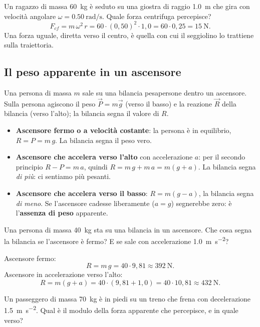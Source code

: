 \begin{testexample}
Un ragazzo di massa \SI{60}{\kilo\gram} è seduto su una giostra di raggio \SI{1,0}{\metre} che gira con velocità angolare $\omega = \SI{0,50}{\radian\per\second}$. Quale forza centrifuga percepisce?
\[ F_{cf} = m\,\omega^2\,r = 60 \cdot (0{,}50)^2 \cdot 1{,}0 = 60 \cdot 0{,}25 = \SI{15}{\newton}. \]
Una forza uguale, diretta verso il centro, è quella con cui il seggiolino lo trattiene sulla traiettoria.
\end{testexample}

\subsection{Il peso apparente in un ascensore}
Una persona di massa $m$ sale su una bilancia pesapersone dentro un ascensore. Sulla persona agiscono il peso $\vec P = m\vec g$ (verso il basso) e la reazione $\vec R$ della bilancia (verso l'alto); la bilancia segna il valore di $R$.

\begin{itemize}
    \item \textbf{Ascensore fermo o a velocità costante}: la persona è in equilibrio, $R = P = m\,g$. La bilancia segna il peso vero.
    \item \textbf{Ascensore che accelera verso l'alto} con accelerazione $a$: per il secondo principio $R - P = m\,a$, quindi $R = m\,g + m\,a = m(g + a)$. La bilancia segna \emph{di più}: ci sentiamo più pesanti.
    \item \textbf{Ascensore che accelera verso il basso}: $R = m(g - a)$, la bilancia segna \emph{di meno}. Se l'ascensore cadesse liberamente ($a = g$) segnerebbe zero: è l'\textbf{assenza di peso} apparente.
\end{itemize}

\begin{testexample}
Una persona di massa \SI{40}{\kilo\gram} sta su una bilancia in un ascensore. Che cosa segna la bilancia se l'ascensore è fermo? E se sale con accelerazione \SI{1,0}{\metre\per\second\squared}?

Ascensore fermo:
\[ R = m\,g = 40 \cdot 9{,}81 \approx \SI{392}{\newton}. \]
Ascensore in accelerazione verso l'alto:
\[ R = m(g + a) = 40 \cdot (9{,}81 + 1{,}0) = 40 \cdot 10{,}81 \approx \SI{432}{\newton}. \]
\end{testexample}

\begin{esercizio}
Un passeggero di massa \SI{70}{\kilo\gram} è in piedi su un treno che frena con decelerazione \SI{1,5}{\metre\per\second\squared}. Qual è il modulo della forza apparente che percepisce, e in quale verso?\\
\end{esercizio}

